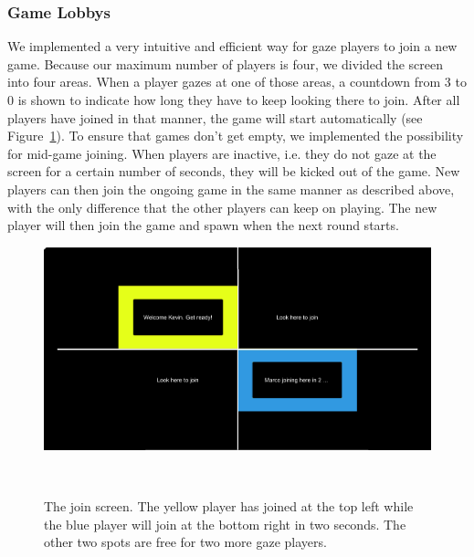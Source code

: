 \documentclass{sigchi}
\begin{document}
\subsubsection{Game Lobbys}
We implemented a very intuitive and efficient way for gaze players to join a new game. Because our maximum number of players is four, we divided the screen into four areas. When a player gazes at one of those areas, a countdown from 3 to 0 is shown to indicate how long they have to keep looking there to join. After all players have joined in that manner, the game will start automatically  (see Figure~\ref{fig:figure3}). To ensure that games don't get empty, we implemented the possibility for mid-game joining. When players are inactive, i.e. they do not gaze at the screen for a certain number of seconds, they will be kicked out of the game. New players can then join the ongoing game in the same manner as described above, with the only difference that the other players can keep on playing. The new player will then join the game and spawn when the next round starts. 
\begin{figure}
\centering
  \includegraphics[width=0.9\columnwidth]{figures/join}
  \caption{The join screen. The yellow player has joined at the top left while the blue player will join at the bottom right in two seconds. The other two spots are free for two more gaze players. }~\label{fig:figure3}
\end{figure}
\end{document}
